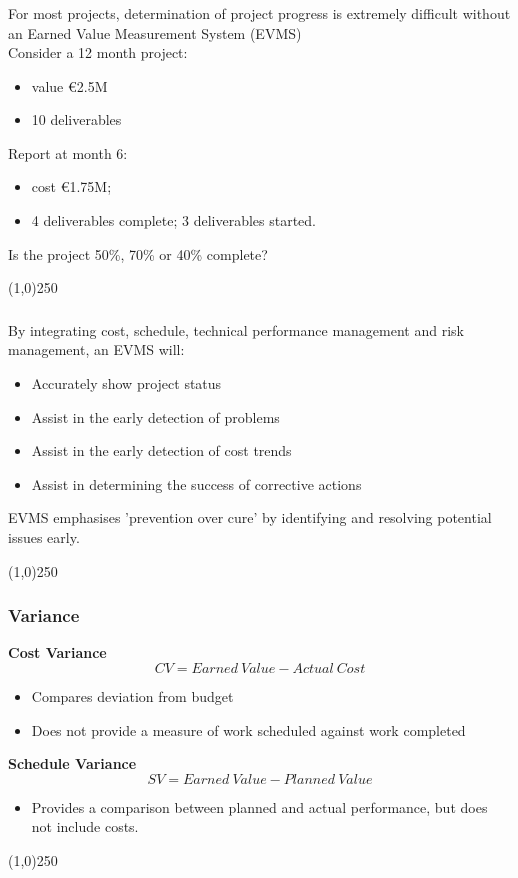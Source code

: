 \begin{frame}
\frametitle{}
For most projects, determination of project progress is extremely difficult without an Earned Value Measurement System (EVMS)\\
Consider a 12 month project: 
\begin{itemize}
	\item value \euro2.5M  
	\item 10 deliverables
\end{itemize}
Report at month 6: 
\begin{itemize}
	\item cost \euro1.75M; 
	\item 4 deliverables complete; 3 deliverables started.
\end{itemize}
Is the project 50\%, 70\% or 40\% complete? 
\end{frame}
\begin{center}\line(1,0){250}\end{center}






\begin{frame}
\frametitle{}
By integrating cost, schedule, technical performance management and risk management, an EVMS will:
\begin{itemize}
	\item Accurately show project status
	\item Assist in the early detection of problems
	\item Assist in the early detection of cost trends
	\item Assist in determining the success of corrective actions
\end{itemize}
EVMS emphasises 'prevention over cure' by identifying and resolving potential issues early.\\
\end{frame}
\begin{center}\line(1,0){250}\end{center}






\begin{frame}
\frametitle{Variance}
\textbf{Cost Variance}
\[
CV = Earned\: Value - Actual\: Cost
\]
\begin{itemize}
	\item Compares deviation from budget
	\item Does not provide a measure of work scheduled against work completed
\end{itemize}
\textbf{Schedule Variance}
\[
SV = Earned\: Value - Planned\: Value
\]
\begin{itemize}
	\item Provides a comparison between planned and actual performance, but does not include costs.
\end{itemize}
\end{frame}
\begin{center}\line(1,0){250}\end{center}






